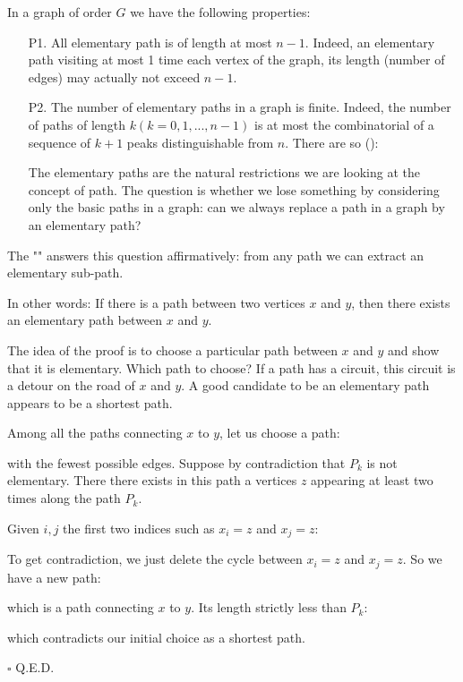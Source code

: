 {\begin{enumerate}
	 In a graph of order $G$ we have the following properties:
	 \begin{enumerate}
	 	\item[P1.] All elementary path is of length at most $n-1$. Indeed, an elementary path visiting at most 1 time each vertex of the graph, its length (number of edges) may actually not exceed $n-1$.
	 	
	 	\item[P2.] The number of elementary paths in a graph is finite. Indeed, the number of paths of length $k(k=0,1,...,n-1)$ is at most the combinatorial of a sequence of $k + 1$ peaks distinguishable from $n$. There are so ():
	 	
		The elementary paths are the natural restrictions we are looking at the concept of path. The question is whether we lose something by considering only the basic paths in a graph: can we always replace a path in a graph by an elementary path?
	 \end{enumerate}
	 \begin{lemma}
	 The "" answers this question affirmatively: from any path we can extract an elementary sub-path.
	 
	 In other words: If there is a path between two vertices $x$ and $y$, then there exists an elementary path between $x$ and $y$.
	 \end{lemma}
	 \begin{dem}
	 The idea of the proof is to choose a particular path between $x$ and $y$ and show that it is elementary. Which path to choose? If a path has a circuit, this circuit is a detour on the road of $x$ and $y$. A good candidate to be an elementary path appears to be a shortest path.
	 
	 Among all the paths connecting $x$ to $y$, let us choose a path:
	 
	 with the fewest possible edges. Suppose by contradiction that $P_k$ is not elementary. There there exists in this path a vertices $z$ appearing at least two times along the path $P_k$.
	 
	 Given $i, j$ the first two indices such as $x_i=z$ and $x_j=z$:
	  
	 To get contradiction, we just delete the cycle between $x_i=z$ and $x_j=z$. So we have a new path:
	 
	 which is a path connecting $x$ to $y$. Its length strictly less than $P_k$: 
	  
	 which contradicts our initial choice as a shortest path.
	 \begin{flushright}
		$\square$  Q.E.D.
	\end{flushright}
	 \end{dem}
	 

\end{enumerate}}

